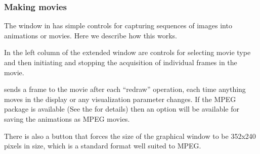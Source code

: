 \subsubsection{Making movies}
\label{sec:view-movies} 

The \viewer{} window in \SR{} has simple controls for capturing sequences
of images into animations or movies.  Here we describe how this works.

In the left column of the extended \viewer{} window are controls for
selecting movie type and then initiating and stopping the acquisition of
individual frames in the movie.

\SR{} sends a frame to the movie after each ``redraw'' operation, \ie{}
each time anything moves in the display or any visualization parameter
changes.  If the MPEG package is available (See the
 for
details) then an option will be available for saving the animations as MPEG
movies.

There is also a button that forces the size of the graphical window to be
352x240 pixels in size, which is a standard format well suited to MPEG.

